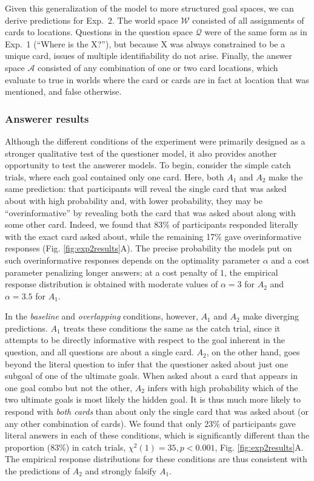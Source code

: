 \documentclass[11pt, floatsintext]{apa6}
\begin{document}
Given this generalization of the model to more structured goal spaces, we can derive predictions for Exp.~2. 
The world space $\mathcal{W}$ consisted of all assignments of cards to locations.
Questions in the question space $\mathcal{Q}$ were of the same form as in Exp.~1 (``Where is the X?''), but because X was always constrained to be a unique card, issues of multiple identifiability do not arise. 
Finally, the answer space $\mathcal{A}$ consisted of any combination of one or two card locations, which evaluate to true in worlds where the card or cards are in fact at location that was mentioned, and false otherwise.



\subsubsection{Answerer results}

Although the different conditions of the experiment were primarily designed as a stronger qualitative test of the questioner model, it also provides another opportunity to test the answerer models. 
To begin, consider the simple catch trials, where each goal contained only one card.
Here, both $A_1$ and $A_2$ make the same prediction: that participants will reveal the single card that was asked about with high probability and, with lower probability, they may be ``overinformative'' by revealing both the card that was asked about along with some other card.
Indeed, we found that 83\% of participants responded literally with the exact card asked about, while the remaining 17\% gave overinformative responses (Fig. \ref{fig:exp2results}A).
The precise probability the models put on such overinformative responses depends on the optimality parameter $\alpha$ and a cost parameter penalizing longer answers; at a cost penalty of $1$, the empirical response distribution is obtained with moderate values of $\alpha=3$ for $A_2$ and $\alpha = 3.5$ for $A_1$.

In the \emph{baseline} and \emph{overlapping} conditions, however, $A_1$ and $A_2$ make diverging predictions. 
$A_1$ treats these conditions the same as the catch trial, since it attempts to be directly informative with respect to the goal inherent in the question, and all questions are about a single card.
$A_2$, on the other hand, goes beyond the literal question to infer that the questioner asked about just one subgoal of one of the ultimate goals.
When asked about a card that appears in one goal combo but not the other, $A_2$ infers with high probability which of the two ultimate goals is most likely the hidden goal. 
It is thus much more likely to respond with \emph{both cards} than about only the single card that was asked about (or any other combination of cards). 
We found that only 23\% of participants gave literal answers in each of these conditions, which is significantly different than the proportion (83\%) in catch trials, $\chi^2(1) = 35, p < 0.001$, Fig. \ref{fig:exp2results}A.
The empirical response distributions for these conditions are thus consistent with the predictions of $A_2$ and strongly falsify $A_1$.
\end{document}
